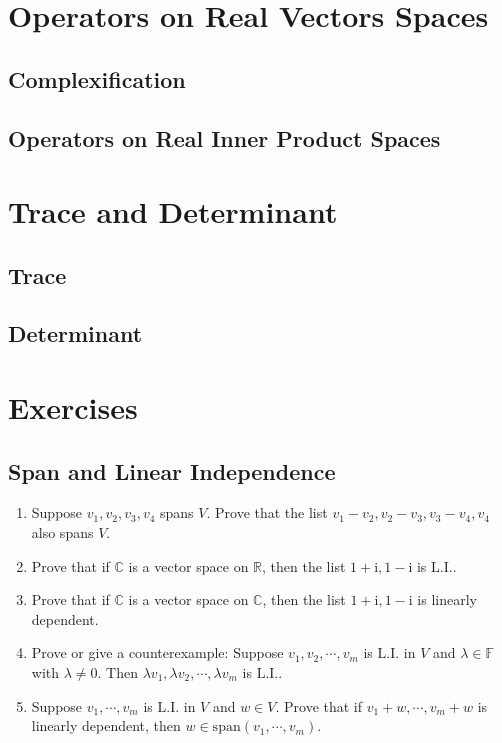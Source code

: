 \documentclass[11pt, letterpaper]{article}
\def\R{\mathbb{R}}
\def\C{\mathbb{C}}
\def\F{\mathbb{F}}
\def\i{\mathrm{i}}
\def\LI{\mathrm{L.I.}}
\def\span{\mathrm{span}}
\begin{document}
\newpage
\section{Operators on Real Vectors Spaces}
\subsection{Complexification}

\newpage
\subsection{Operators on Real Inner Product Spaces}

\newpage
\section{Trace and Determinant}
\subsection{Trace}

\newpage
\subsection{Determinant}

\newpage
\section{Exercises}
\subsection{Span and Linear Independence}
\begin{enumerate}
	\item Suppose $v_1,v_2,v_3,v_4$ spans $V$. Prove that the list $v_1-v_2,v_2-v_3,v_3-v_4,v_4$ also spans $V$.
	\item Prove that if $\C$ is a vector space on $\R$, then the list $1+\i,1-\i$ is $\LI$. 
	\item Prove that if $\C$ is a vector space on $\C$, then the list $1+\i,1-\i$ is linearly dependent.
	\item Prove or give a counterexample: Suppose $v_1,v_2,\cdots,v_m$ is $\LI$ in $V$ and $\lambda\in\F$ with $\lambda\neq0.$ Then $\lambda v_1,\lambda v_2,\cdots,\lambda v_m$ is $\LI$.
	\item Suppose $v_1,\cdots,v_m$ is $\LI$ in $V$ and $w\in V$. Prove that if $v_1+w,\cdots,v_m+w$ is linearly dependent, then $w\in\span(v_1,\cdots,v_m).$
\end{enumerate}
\end{document}
